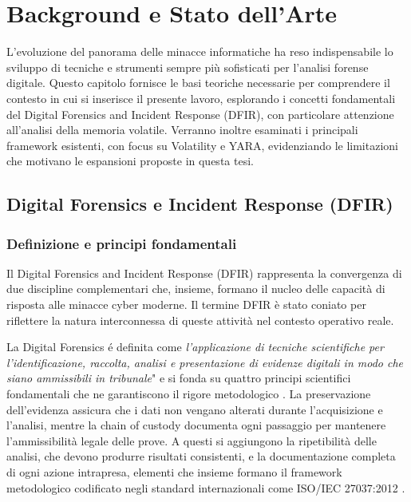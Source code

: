 \chapter{Background e Stato dell'Arte}

L'evoluzione del panorama delle minacce informatiche ha reso indispensabile lo sviluppo di tecniche e strumenti sempre più sofisticati per l'analisi forense digitale. Questo capitolo fornisce le basi teoriche necessarie per comprendere il contesto in cui si inserisce il presente lavoro, esplorando i concetti fondamentali del Digital Forensics and Incident Response (DFIR), con particolare attenzione all'analisi della memoria volatile. Verranno inoltre esaminati i principali framework esistenti, con focus su Volatility e YARA, evidenziando le limitazioni che motivano le espansioni proposte in questa tesi.

\section{Digital Forensics e Incident Response (DFIR)}

\subsection{Definizione e principi fondamentali}

Il Digital Forensics and Incident Response (DFIR) rappresenta la convergenza di due discipline complementari che, insieme, formano il nucleo delle capacità di risposta alle minacce cyber moderne. Il termine DFIR è stato coniato per riflettere la natura interconnessa di queste attività nel contesto operativo reale.

La Digital Forensics é definita come \textit{l'applicazione di tecniche scientifiche per l'identificazione, raccolta, analisi e presentazione di evidenze digitali in modo che siano ammissibili in tribunale}" \cite{palmer2001} e si fonda su quattro principi scientifici fondamentali che ne garantiscono il rigore metodologico \cite{kent2006}. La preservazione dell'evidenza assicura che i dati non vengano alterati durante l'acquisizione e l'analisi, mentre la chain of custody documenta ogni passaggio per mantenere l'ammissibilità legale delle prove. A questi si aggiungono la ripetibilità delle analisi, che devono produrre risultati consistenti, e la documentazione completa di ogni azione intrapresa, elementi che insieme formano il framework metodologico codificato negli standard internazionali come ISO/IEC 27037:2012 \cite{iso27037}.

